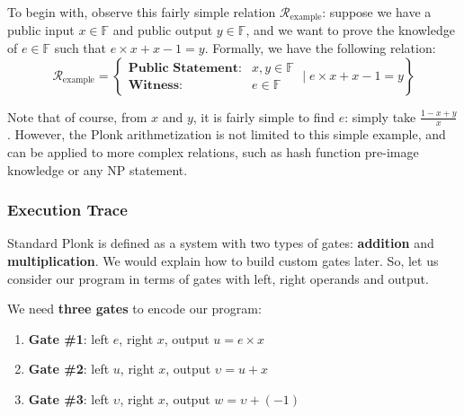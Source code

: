\documentclass[../lecture-notes.tex]{subfiles}
\begin{document}
\begin{example}
To begin with, observe this fairly simple relation
$\mathcal{R}_{\text{example}}$: suppose we have a public input $x \in
\mathbb{F}$ and public output $y \in \mathbb{F}$, and we want to prove the knowledge of $e \in
\mathbb{F}$ such that $e \times x + x - 1 = y$. Formally, we have the following relation:
\begin{equation*}
    \mathcal{R}_{\text{example}} = \left\{ \begin{matrix}
        \textbf{Public Statement:} & x, y \in \mathbb{F} \\
        \textbf{Witness}: & e \in \mathbb{F}
    \end{matrix} \; \Big| \; e \times x + x - 1 = y \right\}
\end{equation*}

\end{example}

\begin{remark}
    Note that of course, from $x$ and $y$, it is fairly simple to find $e$: simply take $\frac{1 - x + y}{x}$. However, the Plonk arithmetization 
    is not limited to this simple example, and can be applied to more complex relations, such as hash function pre-image knowledge or any NP statement.
\end{remark}

\subsubsection{Execution Trace}

Standard Plonk is defined as a system with two types of gates: \textbf{addition}
and \textbf{multiplication}. We would explain how to build custom gates later.
So, let us consider our program in terms of gates with left, right operands and
output. 

\begin{example}
    We need \textbf{three gates} to encode our program:
    \begin{enumerate}
        \item \textbf{Gate \#1}: left $e$, right $x$, output \(u = e \times x\)
        \item \textbf{Gate \#2}: left $u$, right $x$, output \(\upsilon = u + x\)
        \item \textbf{Gate \#3}: left $\upsilon$, right $x$, output \(w = \upsilon + (-1)\)
    \end{enumerate}
\end{example}
\end{document}
